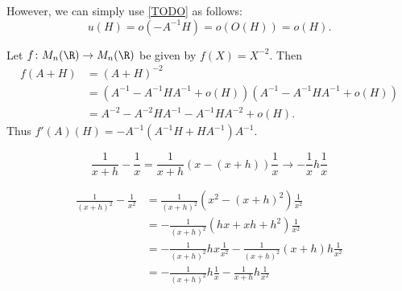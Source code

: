 \begin{examples}
    However, we can simply use \cref{TODO} as follows: \[
        u(H) = o(-A^{-1}H) = o(O(H)) = o(H).
    \]
    \item Let $f\colon M_n(\R) \to M_n(\R)$ be given by $f(X) = X^{-2}$.
    Then \begin{align*}
        f(A + H) &= (A + H)^{-2} \\
            &= (A^{-1} - A^{-1}HA^{-1} + o(H))
                (A^{-1} - A^{-1}HA^{-1} + o(H)) \\
            &= A^{-2} - A^{-2}HA^{-1} - A^{-1}HA^{-2} + o(H).
    \end{align*}
    Thus $f'(A)(H) = -A^{-1} (A^{-1} H + H A^{-1}) A^{-1}$.
\end{examples}
\begin{remarks}
    \item \[
        \frac1{x+h} - \frac1x = \frac1{x+h} (x - (x + h)) \frac1x
        \to -\frac1x h \frac1x
    \]
    \item \begin{align*}
        \frac1{(x+h)^2} - \frac1{x^2}
            &= \frac1{(x+h)^2} (x^2 - (x + h)^2) \frac1{x^2} \\
            &= -\frac1{(x+h)^2} (hx + xh + h^2) \frac1{x^2} \\
            &= -\frac1{(x+h)^2} h x \frac1{x^2}
                -\frac1{(x+h)^2} (x + h) h \frac1{x^2} \\
            &= -\frac1{(x+h)^2} h \frac1x
                -\frac1{x+h} h \frac1{x^2}
    \end{align*}
\end{remarks}
